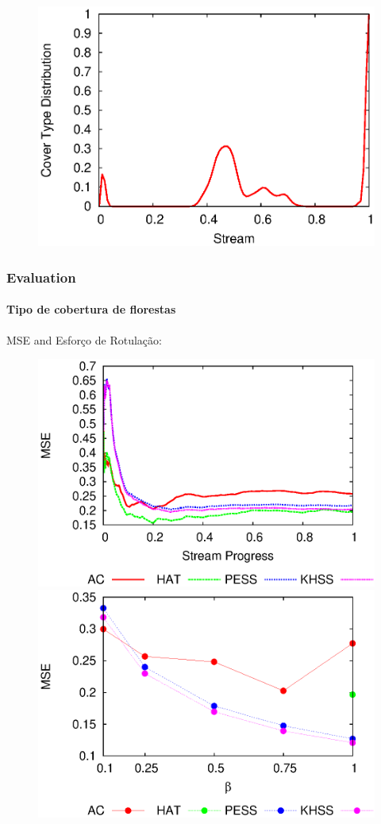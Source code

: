 \documentclass[14pt]{beamer}
\begin{document}
\begin{frame}
\begin{figure}[htp!]
\includegraphics[scale=0.3]{covtype_class_stream_3.eps}
\end{figure}

\end{frame}

\begin{frame}
\frametitle{Evaluation}
\framesubtitle{Tipo de cobertura de florestas}
MSE and Esforço de Rotulação:
\begin{figure}[htp!]
\centering
\includegraphics[scale=0.41]{covtype_mse.eps}
\includegraphics[scale=0.41]{covtype_le_mse.eps}
\end{figure}
\end{frame}
\end{document}
